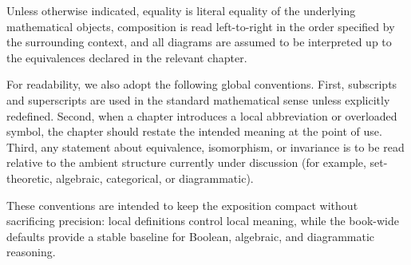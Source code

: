 \documentclass[11pt]{article}
\begin{document}
Unless otherwise indicated, equality is literal equality of the underlying mathematical objects, composition is read left-to-right in the order specified by the surrounding context, and all diagrams are assumed to be interpreted up to the equivalences declared in the relevant chapter.

For readability, we also adopt the following global conventions. First, subscripts and superscripts are used in the standard mathematical sense unless explicitly redefined. Second, when a chapter introduces a local abbreviation or overloaded symbol, the chapter should restate the intended meaning at the point of use. Third, any statement about equivalence, isomorphism, or invariance is to be read relative to the ambient structure currently under discussion (for example, set-theoretic, algebraic, categorical, or diagrammatic).

These conventions are intended to keep the exposition compact without sacrificing precision: local definitions control local meaning, while the book-wide defaults provide a stable baseline for Boolean, algebraic, and diagrammatic reasoning.
\end{document}
